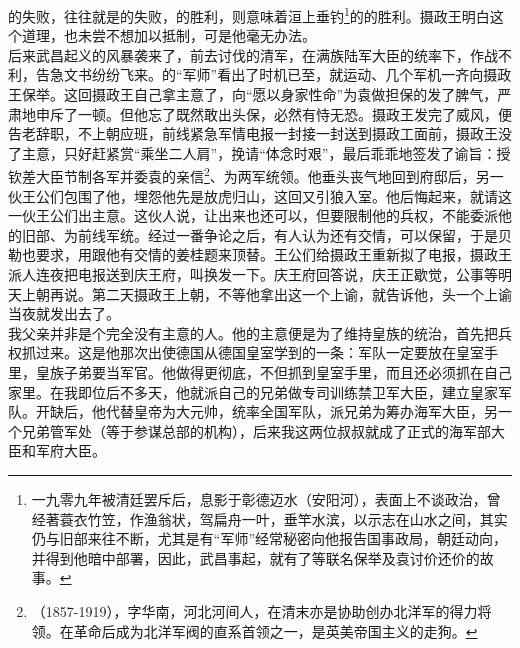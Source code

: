 的失败，往往就是的失败，的胜利，则意味着洹上垂钓\footnote{一九零九年被清廷罢斥后，息影于彰德迈水（安阳河），表面上不谈政治，曾经著蓑衣竹笠，作渔翁状，驾扁舟一叶，垂竿水滨，以示志在山水之间，其实仍与旧部来往不断，尤其是有“军师”经常秘密向他报告国事政局，朝廷动向，并得到他暗中部署，因此，武昌事起，就有了等联名保举及袁讨价还价的故事。}的的胜利。摄政王明白这个道理，也未尝不想加以抵制，可是他毫无办法。\\

后来武昌起义的风暴袭来了，前去讨伐的清军，在满族陆军大臣的统率下，作战不利，告急文书纷纷飞来。的“军师”看出了时机已至，就运动、几个军机一齐向摄政王保举。这回摄政王自己拿主意了，向“愿以身家性命”为袁做担保的发了脾气，严肃地申斥了一顿。但他忘了既然敢出头保，必然有恃无恐。摄政王发完了威风，便告老辞职，不上朝应班，前线紧急军情电报一封接一封送到摄政工面前，摄政王没了主意，只好赶紧赏“乘坐二人肩”，挽请“体念时艰”，最后乖乖地签发了谕旨：授钦差大臣节制各军并委袁的亲信\footnote{（1857-1919），字华南，河北河间人，在清末亦是协助创办北洋军的得力将领。在革命后成为北洋军阀的直系首领之一，是英美帝国主义的走狗。}、为两军统领。他垂头丧气地回到府邸后，另一伙王公们包围了他，埋怨他先是放虎归山，这回又引狼入室。他后悔起来，就请这一伙王公们出主意。这伙人说，让出来也还可以，但要限制他的兵权，不能委派他的旧部、为前线军统。经过一番争论之后，有人认为还有交情，可以保留，于是贝勒也要求，用跟他有交情的姜桂题来顶替。王公们给摄政王重新拟了电报，摄政王派人连夜把电报送到庆王府，叫换发一下。庆王府回答说，庆王正歇觉，公事等明天上朝再说。第二天摄政王上朝，不等他拿出这一个上谕，就告诉他，头一个上谕当夜就发出去了。\\

我父亲并非是个完全没有主意的人。他的主意便是为了维持皇族的统治，首先把兵权抓过来。这是他那次出使德国从德国皇室学到的一条：军队一定要放在皇室手里，皇族子弟要当军官。他做得更彻底，不但抓到皇室手里，而且还必须抓在自己家里。在我即位后不多天，他就派自己的兄弟做专司训练禁卫军大臣，建立皇家军队。开缺后，他代替皇帝为大元帅，统率全国军队，派兄弟为筹办海军大臣，另一个兄弟管军处（等于参谋总部的机构），后来我这两位叔叔就成了正式的海军部大臣和军府大臣。\\

